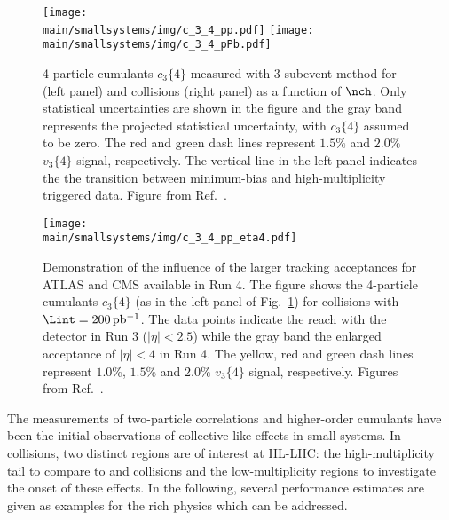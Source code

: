 \documentclass[../report.tex]{subfiles}
\providecommand{\main}{..}
\begin{document}
\begin{figure}[t]
\centering
\texttt{[image: \\main/smallsystems/img/c\_3\_4\_pp.pdf]}
\hfill
\texttt{[image: \\main/smallsystems/img/c\_3\_4\_pPb.pdf]}
\caption{4-particle cumulants $c_3\{4\}$ measured with 3-subevent method for \pp (left panel) and \pPb collisions (right panel) as a function of $\nch$. Only statistical uncertainties are shown in the figure and the gray band represents the projected statistical uncertainty, with $c_3\{4\}$ assumed to be zero. The red and green dash lines represent $1.5\%$ and $2.0\%$ $v_3\{4\}$ signal, respectively. The vertical line in the left panel indicates the the transition between minimum-bias and high-multiplicity triggered data. Figure from Ref.~\cite{}.}
\label{fig:smallsystems_corr_cumulants}
\end{figure}

\begin{figure}[t]
\centering
\texttt{[image: \\main/smallsystems/img/c\_3\_4\_pp\_eta4.pdf]}
\caption{Demonstration of the influence of the larger tracking acceptances for ATLAS and CMS available in Run 4. The figure shows the 4-particle cumulants $c_3\{4\}$ (as in the left panel of Fig.~\ref{fig:smallsystems_corr_cumulants}) for \pp collisions with $\Lint = \unit[200]{pb^{-1}}$. The data points indicate the reach with the detector in Run 3 ($|\eta| < 2.5$) while the gray band the enlarged acceptance of $|\eta| < 4$ in Run 4. The yellow, red and green dash lines represent $1.0\%$, $1.5\%$ and $2.0\%$ $v_3\{4\}$ signal, respectively. Figures from Ref.~\cite{}.}
\label{fig:smallsystems_corr_cumulants_eta4}
\end{figure}

The measurements of two-particle correlations and higher-order cumulants have been the initial observations of collective-like effects in small systems. In \pp collisions, two distinct regions are of interest at HL-LHC: the high-multiplicity tail to compare to \pPb and \PbPb collisions and the low-multiplicity regions to investigate the onset of these effects. In the following, several performance estimates are given as examples for the rich physics which can be addressed.
\end{document}
